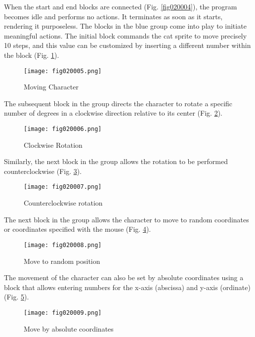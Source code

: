 When the start and end blocks are connected (Fig. \ref{fig020004}), the program becomes idle and performs no actions. It terminates as soon as it starts, rendering it purposeless. The blocks in the blue group come into play to initiate meaningful actions. The initial block commands the cat sprite to move precisely 10 steps, and this value can be customized by inserting a different number within the block (Fig. \ref{fig020005}).

\begin{figure}[H]
   \centering
   \texttt{[image: fig020005.png]}
   \caption{Moving Character}
\label{fig020005}
\end{figure}

The subsequent block in the group directs the character to rotate a specific number of degrees in a clockwise direction relative to its center (Fig. \ref{fig020006}).

\begin{figure}[H]
   \centering
   \texttt{[image: fig020006.png]}
   \caption{Clockwise Rotation}
\label{fig020006}
\end{figure}

Similarly, the next block in the group allows the rotation to be performed counterclockwise (Fig. \ref{fig020007}).

\begin{figure}[H]
   \centering
   \texttt{[image: fig020007.png]}
   \caption{Counterclockwise rotation}
\label{fig020007}
\end{figure}

The next block in the group allows the character to move to random coordinates or coordinates specified with the mouse (Fig. \ref{fig020008}).

\begin{figure}[H]
   \centering
   \texttt{[image: fig020008.png]}
   \caption{Move to random position}
\label{fig020008}
\end{figure}

The movement of the character can also be set by absolute coordinates using a block that allows entering numbers for the x-axis (abscissa) and y-axis (ordinate) (Fig. \ref{fig020009}).

\begin{figure}[H]
   \centering
   \texttt{[image: fig020009.png]}
   \caption{Move by absolute coordinates}
\label{fig020009}
\end{figure}


